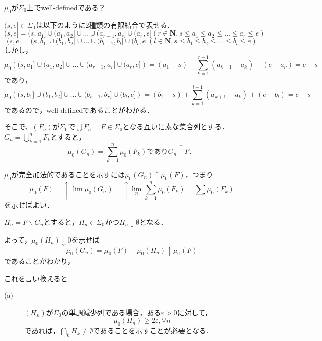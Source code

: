 \documentclass{jsarticle}
\begin{document}
\begin{itembox}{}
    $\mu_0$が$\Sigma_0$上でwell-definedである？
    
    $(s,e]\in\Sigma_0$は以下のように2種類の有限結合で表せる．
    \begin{equation}
        (s,e]=(s,a_1]\cup(a_1,a_2]\cup\dots\cup(a_{r-1},a_r]\cup(a_r,e] (r\in\mathbf{N},s\leq a_1\leq a_2\leq\dots\leq  a_r\leq e) \nonumber
    \end{equation}
    \begin{equation}
        (s,e]=(s,b_1]\cup(b_1,b_2]\cup\dots\cup(b_{l-1},b_l]\cup(b_l,e] (l\in\mathbf{N},s\leq b_1\leq b_2\leq\dots\leq  b_l\leq e) \nonumber
    \end{equation}
    しかし，
    \begin{equation}
        \mu_0\left( (s,a_1]\cup(a_1,a_2]\cup\dots\cup(a_{r-1},a_r]\cup(a_r,e] \right)=(a_1-s)+\sum_{k=1}^{r-1}(a_{k+1}-a_k) +(e-a_r)=e-s \nonumber
    \end{equation}
    であり，
        \begin{equation}
        \mu_0\left( (s,b_1]\cup(b_1,b_2]\cup\dots\cup(b_{r-1},b_r]\cup(b_l,e] \right)=(b_1-s)+\sum_{k=1}^{l-1}(a_{k+1}-a_k) +(e-b_l)=e-s \nonumber
    \end{equation}
    であるので，well-definedであることがわかる．
\end{itembox}

そこで、$(F_n)$が$\Sigma_0$で$\bigcup F_n= F\in\Sigma_0$となる互いに素な集合列とする．
$G_n=\bigcup_{k=1}^n F_k$とすると，
\begin{equation}
    \mu_0(G_n) = \sum_{k=1}^n \mu_0(F_k) であり G_n\uparrow F ． \nonumber
\end{equation}

$\mu_0$が完全加法的であることを示すには$\mu_0(G_n)\uparrow\mu_0(F)$，つまり
\begin{equation}
    \mu_0(F)=\uparrow\lim\mu_0(G_n)=\uparrow\lim_{n}\sum_{k=1}^{n}\mu_0(F_k)=\sum\mu_0(F_k)
\end{equation}
を示せばよい．

$H_n=F\backslash G_n$とすると，$H_n\in\Sigma_0かつH_n\downarrow\emptyset$となる．

よって，$\mu_0(H_n) \downarrow 0$を示せば
\begin{equation}
    \mu_0(G_n) = \mu_0(F)-\mu_0(H_n) \uparrow \mu_0(F)
\end{equation}
であることがわかり，

これを言い換えると

\begin{description}
    \item[\rm (a)]
        $(H_n)$が$\Sigma_0$の単調減少列である場合，ある$\varepsilon>0$に対して，
        \begin{equation}
            \mu_0(H_n)\geq 2\varepsilon , \forall n \nonumber
        \end{equation}
        であれば，$\bigcap_k H_k \neq \emptyset$であることを示すことが必要となる．
\end{description}
\end{document}
